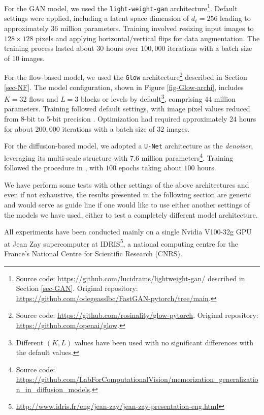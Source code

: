 \documentclass[fleqn,usenatbib]{mnras}
\begin{document}
For the GAN model, we used the \texttt{light-weight-gan} architecture\footnote{Source code: \url{https://github.com/lucidrains/lightweight-gan/} described in Section \ref{sec-GAN}. Original repository: \url{https://github.com/odegeasslbc/FastGAN-pytorch/tree/main}.}. Default settings were applied, including a latent space dimension of $d_\ell=256$ leading to approximately $36$ million parameters. Training involved resizing input images to $128 \times 128$ pixels and applying horizontal/vertical flips for data augmentation. The training process lasted about $30$ hours over $100,000$ iterations with a batch size of $10$ images.

For the flow-based model, we used the \texttt{Glow} architecture\footnote{Source code: \url{https://github.com/rosinality/glow-pytorch}. Original repository: \url{https://github.com/openai/glow}.} described in Section \ref{sec-NF}. The model configuration, shown in Figure \ref{fig-Glow-archi}, includes $K=32$ flows and $L=3$ blocks or levels by default\footnote{Different $(K,L)$ values have been used with no significant differences with the default values.}, comprising $44$ million parameters. Training followed default settings, with image pixel values reduced from 8-bit to 5-bit precision \citep{Kingma2018}. Optimization had required approximately $24$ hours for about $200,000$ iterations with a batch size of $32$ images.

For the diffusion-based model, we adopted a \texttt{U-Net} architecture \citep{ronneberger2015u} as the \textit{denoiser}, leveraging its multi-scale structure with $7.6$ million parameters\footnote{Source code: \url{https://github.com/LabForComputationalVision/memorization_generalization_in_diffusion_models}.}. Training followed the procedure in \cite{kadkhodaie2024generalization}, with $100$ epochs taking about $100$ hours.

{\color{red}We have perform some tests with other settings of the above architectures and even if not exhaustive, the results presented in the following section are generic and would serve as guide line if one would like to use either another settings of the models we have used, either to test a completely different model architecture.

All experiments have been conducted mainly on a single Nvidia V100-32g GPU at Jean Zay supercomputer at IDRIS\footnote{\url{http://www.idris.fr/eng/jean-zay/jean-zay-presentation-eng.html}}, a national computing centre for the France's National Centre for Scientific Research (CNRS).
}
\end{document}
